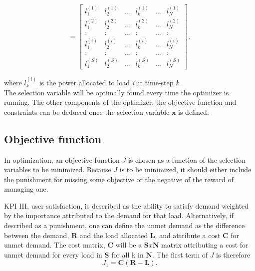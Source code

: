 \begin{equation}
                = \begin{bmatrix}
                        l_1^{(1)} & l_2^{(1)} & \ldots & l_k^{(1)} & \ldots & l_N^{(1)} \\
                        l_1^{(2)} & l_2^{(2)} & \ldots & l_k^{(2)} & \ldots & l_N^{(2)} \\
                        : & : & \ldots & : & \ldots & : \\
                        l_1^{(i)} & l_2^{(i)} & \ldots & l_k^{(i)} & \ldots & l_N^{(i)} \\
                        : & : & \ldots & : & \ldots & : \\
                        l_1^{(S)} & l_2^{(S)} & \ldots & l_k^{(S)} & \ldots & l_N^{(S)}
                    \end{bmatrix}                     ,
\end{equation}

where $l_k^{(i)}$ is the power allocated to load \textit{i} at time-step \textit{k}.\\

The selection variable will be optimally found every time the optimizer is running. The other components of the optimizer; the objective function and constraints can be deduced once the selection variable $\mathbf{x}$ is defined. 

\subsection{Objective function}
In optimization, an objective function $J$ is chosen as a function of the selection variables to be minimized. Because $J$ is to be minimized, it should either include the punishment for missing some objective or the negative of the reward of managing one. 

KPI III, user satisfaction, is described as the ability to satisfy demand weighted by the importance attributed to the demand for that load. Alternatively, if described as a punishment, one can define the unmet demand as the difference between the demand, $\mathbf{R}$ and the load allocated $\mathbf{L}$, and attribute a cost $\mathbf{C}$ for unmet demand. The cost matrix, $\mathbf{C}$ will be a $\mathbf{S}x\mathbf{N}$ matrix attributing a cost for unmet demand for every load in $\mathbf{S}$ for all k in $\mathbf{N}$. The first term of $J$ is therefore\\

\begin{equation}
    J_1    =   \mathbf{C}(\mathbf{R}-\mathbf{L}).
    \label{eq:J1}
\end{equation}

